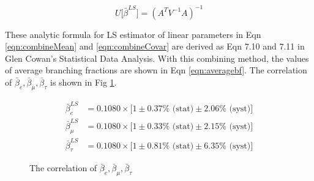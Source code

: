 \begin{equation}
    \boxed{
    U \big[\bar{\beta}^{LS} \big] 
    =   (A^T V^{-1} A)^{-1} 
    }
    \label{eqn:combineCovar}
\end{equation}

These analytic formula for LS estimator of linear parameters in 
Eqn \ref{eqn:combineMean} and \ref{eqn:combineCovar} are derived as Eqn 7.10 and 7.11
in Glen Cowan's Statistical Data Analysis.
With this combining method, the values of average branching 
fractions are shown in Eqn \ref{eqn:averagebf}. The correlation of 
$\bar{\beta}_e,\bar{\beta}_\mu, \bar{\beta}_\tau$ is shown in Fig \ref{fig:corBetaBar}. 

\begin{align}
    \bar{\beta}_e^{LS}    &= 0.1080 \times \big[1 \pm 0.37\% \text{ (stat)} \pm 2.06\% \text{ (syst)} \big] \\
    \bar{\beta}_\mu^{LS}  &= 0.1080 \times \big[1 \pm 0.33\% \text{ (stat)} \pm 2.15\% \text{ (syst)} \big] \\
    \bar{\beta}_\tau^{LS} &= 0.1080 \times \big[1 \pm 0.81\% \text{ (stat)} \pm 6.35\% \text{ (syst)} \big]
    \label{eqn:averagebf}
\end{align}

\begin{figure}[ht]
    \centering
    \caption{ The correlation of $\bar{\beta}_e,\bar{\beta}_\mu, \bar{\beta}_\tau$ }
    \label{fig:corBetaBar}
\end{figure}





